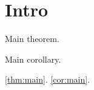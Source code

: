 \section{Intro}
\begin{theorem}\label{thm:main}
Main theorem.
\end{theorem}
\begin{cor}\label{cor:main}
Main corollary.
\end{cor}
\autoref{thm:main}. \autoref{cor:main}.
